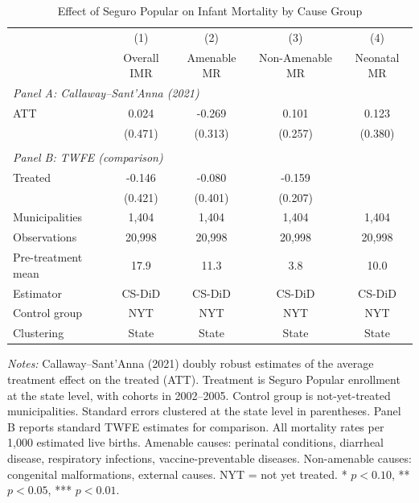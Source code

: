 \begin{table}[H]
\centering
\caption{Effect of Seguro Popular on Infant Mortality by Cause Group}
\label{tab:main}
\begin{threeparttable}
\begin{tabular}{lcccc}
\toprule
 & (1) & (2) & (3) & (4) \\
 & Overall IMR & Amenable MR & Non-Amenable MR & Neonatal MR \\
\midrule
\multicolumn{5}{l}{\textit{Panel A: Callaway--Sant'Anna (2021)}} \\
ATT & 0.024 & -0.269 & 0.101 & 0.123 \\
 & (0.471) & (0.313) & (0.257) & (0.380) \\
\\[-0.5em]
\multicolumn{5}{l}{\textit{Panel B: TWFE (comparison)}} \\
Treated & -0.146 & -0.080 & -0.159 & \\
 & (0.421) & (0.401) & (0.207) & \\
\midrule
Municipalities & 1,404 & 1,404 & 1,404 & 1,404 \\
Observations & 20,998 & 20,998 & 20,998 & 20,998 \\
Pre-treatment mean & 17.9 & 11.3 & 3.8 & 10.0 \\
Estimator & CS-DiD & CS-DiD & CS-DiD & CS-DiD \\
Control group & NYT & NYT & NYT & NYT \\
Clustering & State & State & State & State \\
\bottomrule
\end{tabular}
\begin{tablenotes}[flushleft]
\small
\item \textit{Notes:} Callaway--Sant'Anna (2021) doubly robust estimates of the average treatment effect on the treated (ATT). Treatment is Seguro Popular enrollment at the state level, with cohorts in 2002--2005. Control group is not-yet-treated municipalities. Standard errors clustered at the state level in parentheses. Panel B reports standard TWFE estimates for comparison. All mortality rates per 1,000 estimated live births. Amenable causes: perinatal conditions, diarrheal disease, respiratory infections, vaccine-preventable diseases. Non-amenable causes: congenital malformations, external causes. NYT = not yet treated. * $p<0.10$, ** $p<0.05$, *** $p<0.01$.
\end{tablenotes}
\end{threeparttable}
\end{table}
